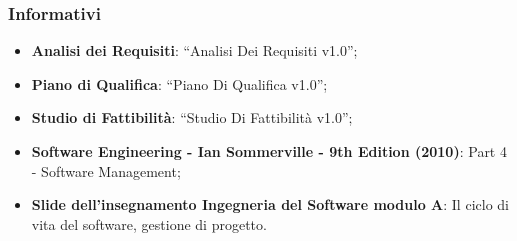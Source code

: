 		\subsubsection{Informativi}
			\begin{itemize}
				\item \textbf{Analisi dei Requisiti}: “Analisi Dei Requisiti v1.0”;
				\item \textbf{Piano di Qualifica}: “Piano Di Qualifica v1.0”;
				\item \textbf{Studio di Fattibilità}: “Studio Di Fattibilità v1.0”;
				\item \textbf{Software Engineering - Ian Sommerville - 9th Edition (2010)}: Part 4 - Software Management;
				\item \textbf{Slide dell’insegnamento Ingegneria del Software modulo A}: Il ciclo di vita del software, gestione di progetto.
			\end{itemize}